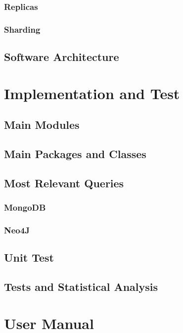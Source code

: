 \documentclass[a4paper]{report}
\begin{document}
\subsection{Replicas}
\subsection{Sharding}
\section{Software Architecture}


\chapter{Implementation and Test}
\section{Main Modules}
\section{Main Packages and Classes}
\section{Most Relevant Queries}
\subsection{MongoDB}
\subsection{Neo4J}
\section{Unit Test}
\section{Tests and Statistical Analysis}

\chapter{User Manual}
\end{document}
